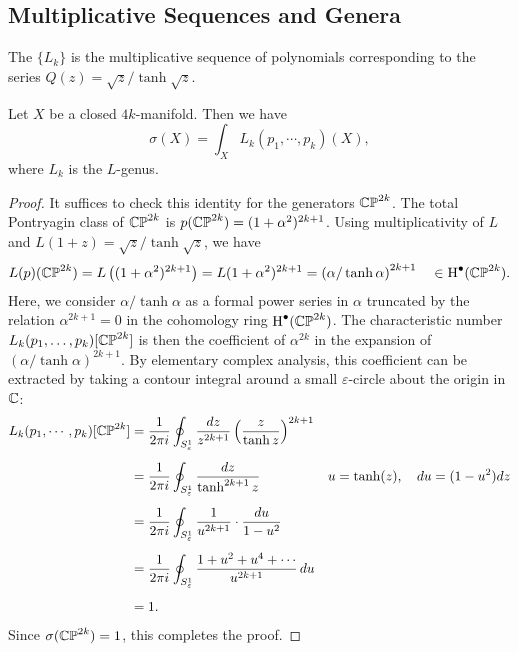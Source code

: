 \subsection{Multiplicative Sequences and Genera}


\begin{definition}
	The  $\{L_k\}$ is the multiplicative sequence of polynomials corresponding to the series $Q(z) = \sqrt{z}/\tanh\sqrt{z}$.
\end{definition}

\begin{theorem}[Hirzebruch]\label{thm:hirzebruch-signature-theorem}
	Let $X$ be a closed $4k$-manifold. Then we have
	\[
		\sigma(X) = \int_X L_k(p_1, \cdots, p_k)(X),
	\]
	where $L_k$ is the $L$-genus.
\end{theorem}
\begin{proof}
	It suffices to check this identity for the generators $\mathbb{CP}^{2k}$. The total Pontryagin class of $\mathbb{CP}^{2k}$ is $p(\mathbb{CP}^{2k})=(1+\alpha^2)^{2k+1}$. Using multiplicativity of $L$ and $L(1+z)=\sqrt{z}/\tanh\sqrt{z}$, we have
	\[
		\begin{aligned}
			L(p)(\mathbb{CP}^{2k})
			= L\left((1+\alpha^2)^{2k+1}\right)
			= L(1+\alpha^2)^{2k+1}
			= \left(\alpha/\tanh \alpha\right)^{2k+1}
			\quad\in\operatorname{H}^\bullet(\mathbb{CP}^{2k}).
		\end{aligned}
	\]
	Here, we consider $\alpha/\tanh \alpha$ as a formal power series in $\alpha$ truncated by the relation $\alpha^{2k+1}=0$ in the cohomology ring $\operatorname{H}^\bullet(\mathbb{CP}^{2k})$. The characteristic number $L_k(p_1,\ldots,p_k)[\mathbb{CP}^{2k}]$ is then the coefficient of $\alpha^{2k}$ in the expansion of $(\alpha/\tanh \alpha)^{2k+1}$.
	By elementary complex analysis, this coefficient can be extracted by taking a contour integral around a small $\varepsilon$-circle about the origin in $\mathbb{C}$:
	\[
		\begin{aligned}
			L_k(p_1,\cdots, p_k)[\mathbb{CP}^{2k}]
			 & = \frac{1}{2\pi i}\oint_{S^1_\varepsilon} \frac{dz}{z^{2k+1}} \left(\frac{z}{\tanh z}\right)^{2k+1}
			 &                                                                                                       \\[0.5em]
			 & = \frac{1}{2\pi i}\oint_{S^1_\varepsilon} \frac{dz}{\tanh^{2k+1} z}\quad
			 & u  =\tanh(z),\quad
			du =(1-u^2)dz
			\\[0.5em]
			 & = \frac{1}{2\pi i}\oint_{S^1_\varepsilon} \frac{1}{u^{2k+1}}\cdot\frac{du}{1-u^2}
			 &                                                                                                       \\[0.5em]
			 & = \frac{1}{2\pi i}\oint_{S^1_\varepsilon} \frac{1+u^2+u^4+\cdots}{u^{2k+1}}\,du                       \\[0.5em]
			 & =1.                                                                                                 &
		\end{aligned}
	\]
	Since $\sigma(\mathbb{CP}^{2k})=1$, this completes the proof.
\end{proof}

